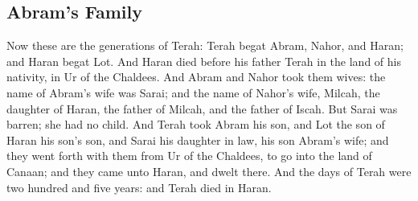 \begin{biblechapter}
\section*{Abram's Family}
\verse Now these are the generations of Terah: Terah begat Abram, Nahor, and Haran; and Haran begat Lot.
\verse And Haran died before his father Terah in the land of his nativity, in Ur of the Chaldees.
\verse And Abram and Nahor took them wives: the name of Abram's wife was Sarai; and the name of Nahor's wife, Milcah, the daughter of Haran, the father of Milcah, and the father of Iscah.
\verse But Sarai was barren; she had no child.
\verse And Terah took Abram his son, and Lot the son of Haran his son's son, and Sarai his daughter in law, his son Abram's wife; and they went forth with them from Ur of the Chaldees, to go into the land of Canaan; and they came unto Haran, and dwelt there.
\verse And the days of Terah were two hundred and five years: and Terah died in Haran.
\end{biblechapter}


